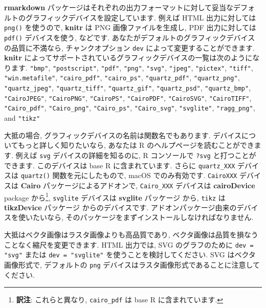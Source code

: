\documentclass[
  11pt,
]{bxjsreport}
\begin{document}
\textbf{rmarkdown} パッケージはそれぞれの出力フォーマットに対して妥当なデフォルトのグラフィックデバイスを設定しています. 例えば HTML 出力に対しては \texttt{png()} を使うので, \textbf{knitr} は PNG 画像ファイルを生成し, PDF 出力に対しては \texttt{pdf()} デバイスを使う, などです. あなたがデフォルトのグラフィックデバイスの品質に不満なら, チャンクオプション \texttt{dev} によって変更することができます. \textbf{knitr} によってサポートされているグラフィックデバイスの一覧は次のようになります. \texttt{"bmp"}, \texttt{"postscript"}, \texttt{"pdf"}, \texttt{"png"}, \texttt{"svg"}, \texttt{"jpeg"}, \texttt{"pictex"}, \texttt{"tiff"}, \texttt{"win.metafile"}, \texttt{"cairo\_pdf"}, \texttt{"cairo\_ps"}, \texttt{"quartz\_pdf"}, \texttt{"quartz\_png"}, \texttt{"quartz\_jpeg"}, \texttt{"quartz\_tiff"}, \texttt{"quartz\_gif"}, \texttt{"quartz\_psd"}, \texttt{"quartz\_bmp"}, \texttt{"CairoJPEG"}, \texttt{"CairoPNG"}, \texttt{"CairoPS"}, \texttt{"CairoPDF"}, \texttt{"CairoSVG"}, \texttt{"CairoTIFF"}, \texttt{"Cairo\_pdf"}, \texttt{"Cairo\_png"}, \texttt{"Cairo\_ps"}, \texttt{"Cairo\_svg"}, \texttt{"svglite"}, \texttt{"ragg\_png"}, and \texttt{"tikz"}

大抵の場合, グラフィックデバイスの名前は関数名でもあります. デバイスについてもっと詳しく知りたいなら, あなたは R のヘルプページを読むことができます. 例えば \texttt{svg} デバイスの詳細を知るのに, R コンソールで \texttt{?svg} と打つことができます. このデバイスは base R に含まれています. さらに \texttt{quartz\_XXX} デバイスは \texttt{quartz()} 関数を元にしたもので, macOS でのみ有効です. \texttt{CairoXXX} デバイスは \textbf{Cairo} \autocite{R-Cairo} パッケージによるアドオンで, \texttt{Cairo\_XXX} デバイスは \textbf{cairoDevice} package \autocite{R-cairoDevice} から\footnote{\textbf{訳注}: これらと異なり, \texttt{cairo\_pdf} は base R に含まれています.}, \texttt{svglite} デバイスは \textbf{svglite} パッケージ \autocite{R-svglite} から, \texttt{tikz} は \textbf{tikzDevice} パッケージ \autocite{R-tikzDevice} からのデバイスです. アドオンパッケージ由来のデバイスを使いたいなら, そのパッケージをまずインストールしなければなりません.

大抵はベクタ画像はラスタ画像よりも高品質であり, ベクタ画像は品質を損なうことなく縮尺を変更できます. HTML 出力では, SVG のグラフのために \texttt{dev = "svg"} または \texttt{dev = "svglite"} を使うことを検討してください. SVG はベクタ画像形式で, デフォルトの \texttt{png} デバイスはラスタ画像形式であることに注意してください.
\end{document}
